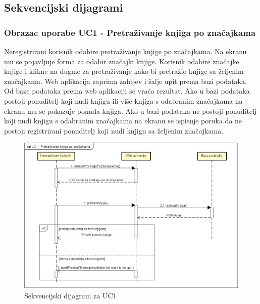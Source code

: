 					\eject
			
					
				
			\subsection{Sekvencijski dijagrami}
			\subsubsection{Obrazac uporabe UC1 - Pretraživanje knjiga po značajkama}
			Neregistrirani korisnik odabire pretraživanje knjige po značajkama. Na ekranu mu se pojavljuje forma za odabir značajki knjige. Korisnik odabire značajke knjige i klikne na dugme za pretraživanje kako bi pretražio knjige sa željenim značajkama. Web aplikacija zaprima zahtjev i šalje upit prema bazi podataka. Od baze podataka prema web aplikaciji se vraća rezultat. Ako u bazi podataka postoji ponuditelj koji nudi knjigu ili više knjiga s odabranim značajkama na ekranu mu se pokazuje ponuda knjiga. Ako u bazi podataka ne postoji ponuditelj koji nudi knjigu s odabranim značajkama na ekranu se ispisuje poruka da ne postoji registrirani ponuditelj koji nudi knjigu sa željenim značajkama.
			
			
				\begin{figure}[H]
					\includegraphics[width=\textwidth]{dijagrami/SequenceDiagram1.PNG} %
					\centering
					\caption{Sekvencijski dijagram za UC1}
					\label{fig:seqdiag1}
				\end{figure}
				
				\eject
				
